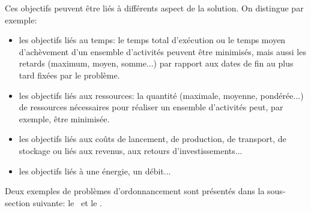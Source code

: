 Ces objectifs peuvent être liés à différents aspect de la solution. On
distingue par exemple:
\begin{itemize}
\item les objectifs liés au temps: le temps total d'exécution ou le temps moyen
  d'achèvement d'un ensemble d'activités peuvent être minimisés, mais
  aussi  les retards (maximum, moyen, somme...) par rapport
  aux dates de fin au plus tard fixées par le problème.
\item les objectifs liés aux ressources: la quantité (maximale,
  moyenne, pondérée...) de ressources nécessaires pour réaliser un
  ensemble d'activités peut, par exemple, être minimisée.
\item les objectifs liés aux coûts de lancement, de production, de
  transport, de stockage ou liés aux revenus, aux retours
  d'investissements... 
\item les objectifs liés à une énergie, un débit...
\end{itemize}

Deux exemples de problèmes d'ordonnancement sont présentés dans la
sous-section suivante: le \RCPSP~et le \CUSP. 